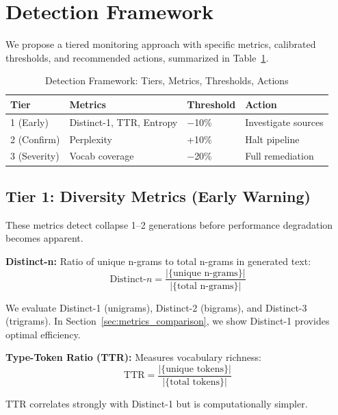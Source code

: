 \documentclass[conference]{IEEEtran}
\begin{document}
\section{Detection Framework}

We propose a tiered monitoring approach with specific metrics, calibrated thresholds, and recommended actions, summarized in Table~\ref{tab:detection_summary}.

\begin{table}[!t]
\caption{Detection Framework: Tiers, Metrics, Thresholds, Actions}
\label{tab:detection_summary}
\centering
\small
\begin{tabular}{@{}p{1.1cm}p{2.2cm}p{1.3cm}p{2.2cm}@{}}
\toprule
\textbf{Tier} & \textbf{Metrics} & \textbf{Threshold} & \textbf{Action} \\
\midrule
1 (Early) & Distinct-1, TTR, Entropy & $-$10\% & Investigate sources \\
2 (Confirm) & Perplexity & +10\% & Halt pipeline \\
3 (Severity) & Vocab coverage & $-$20\% & Full remediation \\
\bottomrule
\end{tabular}
\end{table}

\subsection{Tier 1: Diversity Metrics (Early Warning)}

These metrics detect collapse 1--2 generations before performance degradation becomes apparent.

\textbf{Distinct-n:} Ratio of unique n-grams to total n-grams in generated text:
\begin{equation}
\text{Distinct-}n = \frac{|\{\text{unique n-grams}\}|}{|\{\text{total n-grams}\}|}
\end{equation}

We evaluate Distinct-1 (unigrams), Distinct-2 (bigrams), and Distinct-3 (trigrams). In Section~\ref{sec:metrics_comparison}, we show Distinct-1 provides optimal efficiency.

\textbf{Type-Token Ratio (TTR):} Measures vocabulary richness:
\begin{equation}
\text{TTR} = \frac{|\{\text{unique tokens}\}|}{|\{\text{total tokens}\}|}
\end{equation}

TTR correlates strongly with Distinct-1 but is computationally simpler.
\end{document}
